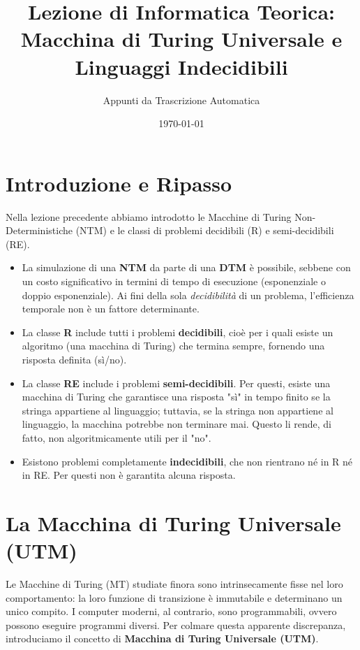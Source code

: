 \documentclass[a4paper]{article}
\title{Lezione di Informatica Teorica: Macchina di Turing Universale e Linguaggi Indecidibili}
\author{Appunti da Trascrizione Automatica}
\date{\today}
\begin{document}
\maketitle
\tableofcontents
\newpage

\section{Introduzione e Ripasso}

Nella lezione precedente abbiamo introdotto le Macchine di Turing Non-Deterministiche (NTM) e le classi di problemi decidibili (R) e semi-decidibili (RE).

\begin{itemize}
    \item La simulazione di una \textbf{NTM} da parte di una \textbf{DTM} è possibile, sebbene con un costo significativo in termini di tempo di esecuzione (esponenziale o doppio esponenziale). Ai fini della sola \textit{decidibilità} di un problema, l'efficienza temporale non è un fattore determinante.
    \item La classe \textbf{R} include tutti i problemi \textbf{decidibili}, cioè per i quali esiste un algoritmo (una macchina di Turing) che termina sempre, fornendo una risposta definita (sì/no).
    \item La classe \textbf{RE} include i problemi \textbf{semi-decidibili}. Per questi, esiste una macchina di Turing che garantisce una risposta "sì" in tempo finito se la stringa appartiene al linguaggio; tuttavia, se la stringa non appartiene al linguaggio, la macchina potrebbe non terminare mai. Questo li rende, di fatto, non algoritmicamente utili per il "no".
    \item Esistono problemi completamente \textbf{indecidibili}, che non rientrano né in R né in RE. Per questi non è garantita alcuna risposta.
\end{itemize}

\section{La Macchina di Turing Universale (UTM)}

Le Macchine di Turing (MT) studiate finora sono intrinsecamente fisse nel loro comportamento: la loro funzione di transizione è immutabile e determinano un unico compito. I computer moderni, al contrario, sono programmabili, ovvero possono eseguire programmi diversi. Per colmare questa apparente discrepanza, introduciamo il concetto di \textbf{Macchina di Turing Universale (UTM)}.
\end{document}

